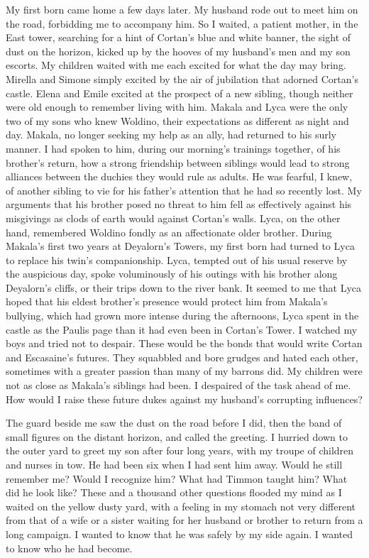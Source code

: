 \documentclass{article}
\begin{document}
My first born came home a few days later. My husband rode out to meet him on the road, forbidding me to accompany him. So I waited, a patient mother, in the East tower, searching for a hint of Cortan's blue and white banner, the sight of dust on the horizon, kicked up by the hooves of my husband's men and my son escorts. My children waited with me each excited for what the day may bring. Mirella and Simone simply excited by the air of jubilation that adorned Cortan's castle. Elena and Emile excited at the prospect of a new sibling, though neither were old enough to remember living with him. Makala and Lyca were the only two of my sons who knew Woldino, their expectations as different as night and day. Makala, no longer seeking my help as an ally, had returned to his surly manner. I had spoken to him, during our morning's trainings together, of his brother's return, how a strong friendship between siblings would lead to strong alliances between the duchies they would rule as adults. He was fearful, I knew, of another sibling to vie for his father's attention that he had so recently lost. My arguments that his brother posed no threat to him fell as effectively against his misgivings as clods of earth would against Cortan's walls. Lyca, on the other hand, remembered Woldino fondly as an affectionate older brother. During Makala's first two years at Deyalorn's Towers, my first born had turned to Lyca to replace his twin's companionship. Lyca, tempted out of his usual reserve by the auspicious day, spoke voluminously of his outings with his brother along Deyalorn's cliffs, or their trips down to the river bank. It seemed to me that Lyca hoped that his eldest brother's presence would protect him from Makala's bullying, which had grown more intense during the afternoons, Lyca spent in the castle as the Paulis page than it had even been in Cortan's Tower. I watched my boys and tried not to despair. These would be the bonds that would write Cortan and Escasaine's futures. They squabbled and bore grudges and hated each other, sometimes with a greater passion than many of my barrons did. My children were not as close as Makala's siblings had been. I despaired of the task ahead of me. How would I raise these future dukes against my husband's corrupting influences? 

The guard beside me saw the dust on the road before I did, then the band of small figures on the distant horizon, and called the greeting. I hurried down to the outer yard to greet my son after four long years, with my troupe of children and nurses in tow. He had been six when I had sent him away. Would he still remember me? Would I recognize him? What had Timmon taught him? What did he look like? These and a thousand other questions flooded my mind as I waited on the yellow dusty yard, with a feeling in my stomach not very different from that of a wife or a sister waiting for her husband or brother to return from a long campaign. I wanted to know that he was safely by my side again. I wanted to know who he had become. 
\end{document}
